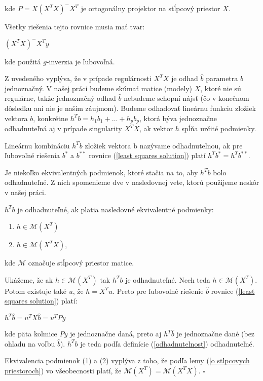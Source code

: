 kde $P = X (X^T X)^- X^T$ je ortogonálny projektor na stĺpcový priestor $X$.

Všetky riešenia tejto rovnice musia mať tvar:

\begin{center}
$
(X^T X)^- X^T y
$
\end{center}

kde použitá $g$-inverzia je ľubovoľná.

Z uvedeného vyplýva, že v prípade regulárnosti $X^T X$ je odhad $\hat{b}$ parametra $b$ jednoznačný. 
V našej práci budeme skúmať matice (modely) $X$, ktoré nie sú regulárne, 
takže jednoznačný odhad $\hat{b}$ nebudeme schopní nájsť (čo v konečnom dôsledku ani nie je naším záujmom).
Budeme odhadovať lineárnu funkciu zložiek vektora $b$, konkrétne $h^T b = h_1 b_1 + \ldots + h_p b_p$,
ktorá býva jednoznačne odhadnuteľná aj v prípade singularity $X^T X$, ak vektor $h$ spĺňa určité podmienky. 

\begin{defin}
\label{odhadnutelnost}
Lineárnu kombináciu $h^T b$ zložiek vektora b nazývame odhadnuteľnou,
ak pre ľubovoľné riešenia $b^*$ a $b^{**}$ rovnice (\ref{least squares solution}) platí $h^T b^* = h^T b^{**}$.
\end{defin}

Je niekoľko ekvivalentných podmienok, ktoré stačia na to, aby $h^T b$ bolo odhadnuteľné. 
Z nich spomenieme dve v nasledovnej vete, ktorú použijeme neskôr v našej práci.

\begin{theorem}
\label{veta1}
$h^T b$ je odhadnuteľné, ak platia nasledovné ekvivalentné podmienky:
\begin{enumerate}
  \item $h \in \mathcal{M}(X^T)$
  \item $h \in \mathcal{M}(X^T X)$,
\end{enumerate}
kde $\mathcal{M}$ označuje stĺpcový priestor matice.
\end{theorem}

\begin{dokaz}
Ukážeme, že ak $h \in \mathcal{M}(X^T)$ tak $h^T b$ je odhadnuteľné.
Nech teda $h \in \mathcal{M}(X^T)$. Potom existuje také $u$, že $h = X^T u$.
Preto pre ľubovoľné riešenie $\hat{b}$ rovnice (\ref{least squares solution}) platí:

\begin{center}
$
h^T \hat{b} = u^T X \hat{b} = u^T P y
$
\end{center}

kde päta kolmice $Py$ je jednoznačne daná, preto aj $h^T \hat{b}$ je jednoznačne dané (bez ohľadu na voľbu $\hat{b}$).
$h^T b$ je teda podľa definície (\ref{odhadnutelnost}) odhadnuteľné.

Ekvivalencia podmienok (1) a (2) vyplýva z toho, že podľa lemy (\ref{o stlpcovych priestoroch}) vo všeobecnosti platí, že $\mathcal{M}(X^T) = \mathcal{M}(X^T X)$.
$\square$
\end{dokaz}

